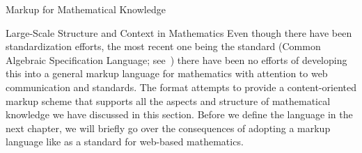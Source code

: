 \begin{tchapter}[id=math-markup]{Markup for Mathematical Knowledge}
\begin{tsection}[id=meta-theories]{Large-Scale Structure and Context in Mathematics}
  Even though there have been standardization efforts, the most recent one being the
  {\casl} standard (Common Algebraic Specification Language; see~\cite{CoFI:2004:CASL-RM}) there have
  been no efforts of developing this into a general markup language for mathematics with
  attention to web communication and standards. The {\omdoc} format attempts to provide a
  content-oriented markup scheme that supports all the aspects and structure of
  mathematical knowledge we have discussed in this section. Before we define the language
  in the next chapter, we will briefly go over the consequences of adopting a markup
  language like {\omdoc} as a standard for web-based mathematics.

\end{tsection}
\end{tchapter}


